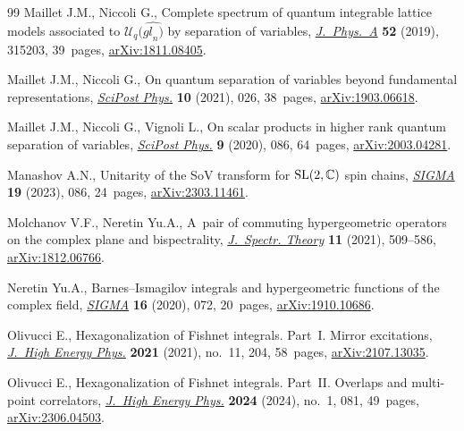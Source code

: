 \begin{thebibliography}{99}
Maillet J.M., Niccoli G., Complete spectrum of quantum integrable lattice
 models associated to {$\mathcal{U}_q(\widehat{{gl}_n)}$} by separation of
 variables,
 \href{https://doi.org/10.1088/1751-8121/ab2930}{\textit{J.~Phys.~A}}
 \textbf{52} (2019), 315203, 39~pages,
 \href{http://arxiv.org/abs/1811.08405}{arXiv:1811.08405}.

Maillet J.M., Niccoli G., On quantum separation of variables beyond fundamental
 representations,
 \href{https://doi.org/10.21468/scipostphys.10.2.026}{\textit{SciPost Phys.}}
 \textbf{10} (2021), 026, 38~pages,
 \href{http://arxiv.org/abs/1903.06618}{arXiv:1903.06618}.

Maillet J.M., Niccoli G., Vignoli L., On scalar products in higher rank quantum
 separation of variables,
 \href{https://doi.org/10.21468/SciPostPhys.9.6.086}{\textit{SciPost Phys.}}
 \textbf{9} (2020), 086, 64~pages,
 \href{http://arxiv.org/abs/2003.04281}{arXiv:2003.04281}.

Manashov A.N., Unitarity of the {S}o{V} transform for {${\rm SL}(2,\mathbb C)$}
 spin chains, \href{https://doi.org/10.3842/SIGMA.2023.086}{\textit{SIGMA}}
 \textbf{19} (2023), 086, 24~pages,
 \href{http://arxiv.org/abs/2303.11461}{arXiv:2303.11461}.

Molchanov V.F., Neretin Yu.A., A~pair of commuting hypergeometric operators on
 the complex plane and bispectrality,
 \href{https://doi.org/10.4171/jst/349}{\textit{J.~Spectr. Theory}}
 \textbf{11} (2021), 509--586,
 \href{http://arxiv.org/abs/1812.06766}{arXiv:1812.06766}.

Neretin Yu.A., Barnes--{I}smagilov integrals and hypergeometric functions of the
 complex field, \href{https://doi.org/10.3842/SIGMA.2020.072}{\textit{SIGMA}}
 \textbf{16} (2020), 072, 20~pages,
 \href{http://arxiv.org/abs/1910.10686}{arXiv:1910.10686}.

Olivucci E., Hexagonalization of {F}ishnet integrals. {P}art~{I}. {M}irror
 excitations, \href{https://doi.org/10.1007/jhep11(2021)204}{\textit{J.~High
 Energy Phys.}} \textbf{2021} (2021), no.~11, 204, 58~pages,
 \href{http://arxiv.org/abs/2107.13035}{arXiv:2107.13035}.

Olivucci E., Hexagonalization of {F}ishnet integrals. {P}art~{II}. {O}verlaps
 and multi-point correlators,
 \href{https://doi.org/10.1007/jhep01(2024)081}{\textit{J.~High Energy Phys.}}
 \textbf{2024} (2024), no.~1, 081, 49~pages,
 \href{http://arxiv.org/abs/2306.04503}{arXiv:2306.04503}.


\end{thebibliography}
